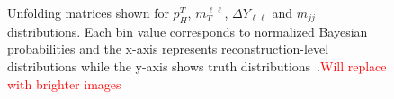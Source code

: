 \begin{figure}[!h]
\centering
  \hfill
  \hfill
  \hfill
\caption{\label{fig:unfoldingmatrices}Unfolding matrices shown for $p^T_H$, $m_T^{\ell\ell}$, $\Delta Y_{\ell\ell}$ and $m_{jj}$ distributions. Each bin value corresponds to normalized Bayesian probabilities and the x-axis represents reconstruction-level distributions while the y-axis shows truth distributions~\cite{ourSupportNote}.\textcolor{red}{Will replace with brighter images}}
\end{figure}  

